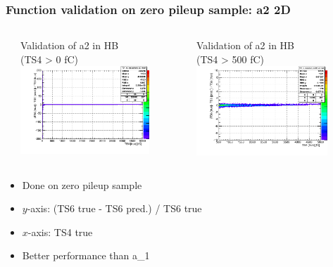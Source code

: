 \documentclass[bigger]{beamer}
\begin{document}
\begin{frame}
\frametitle{Function validation on zero pileup sample: a2 2D}
\label{sec-3-2-11}
\begin{columns} %
\label{sec-3-2-11-1}
\begin{column}{0.55\textwidth}
\label{sec-3-2-11-1-1}

\centering
Validation of a2 in HB \\ (TS4 > 0 fC)
\includegraphics[width=0.8\textwidth]{fig/crosscheck_a2_0.png}
\end{column}
\begin{column}{0.55\textwidth}
\label{sec-3-2-11-1-2}

\centering
Validation of a2 in HB \\ (TS4 > 500 fC)
\includegraphics[width=0.8\textwidth]{fig/crosscheck_over500_a2_0.png}
\end{column}
\end{columns}
\label{sec-3-2-11-2}
\begin{itemize}

\item Done on zero pileup sample
\label{sec-3-2-11-2-1}%

\item $y$-axis: (TS6 true - TS6 pred.) / TS6 true
\label{sec-3-2-11-2-2}%

\item $x$-axis: TS4 true
\label{sec-3-2-11-2-3}%

\item Better performance than a\_1
\label{sec-3-2-11-2-4}%
\end{itemize} %
\end{frame}
\end{document}
